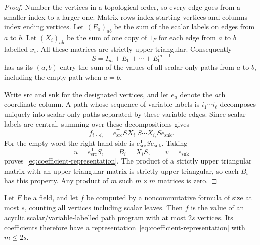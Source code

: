 \begin{proof}
Number the vertices in a topological order, so every edge goes from a smaller
index to a larger one.  Matrix rows index starting vertices and columns index
ending vertices.  Let $(E_0)_{ab}$ be the sum of the scalar labels on edges
from $a$ to $b$.  Let $(X_i)_{ab}$ be the sum of one copy of $1_F$ for each
edge from $a$ to $b$ labelled $x_i$.  All these matrices are strictly upper
triangular.  Consequently
\[
 S=I_m+E_0+\cdots+E_0^{m-1}
\]
has as its $(a,b)$ entry the sum of the values of all scalar-only paths from
$a$ to $b$, including the empty path when $a=b$.

Write $\mathrm{src}$ and $\mathrm{snk}$ for the designated vertices, and let
$e_a$ denote the $a$th coordinate column.  A path whose sequence of variable
labels is $i_1\cdots i_\ell$ decomposes uniquely into scalar-only paths
separated by these variable edges.  Since scalar labels are central, summing
over these decompositions gives
\begin{equation}
\label{eq:scalar-path-elimination}
 f_{i_1\cdots i_\ell}
 =e_{\mathrm{src}}^{\mathsf T}
   S X_{i_1}S\cdots X_{i_\ell}S e_{\mathrm{snk}}.
\end{equation}
For the empty word the right-hand side is
$e_{\mathrm{src}}^{\mathsf T}S e_{\mathrm{snk}}$.
Taking
\[
 u=e_{\mathrm{src}}^{\mathsf T}S,
 \qquad B_i=X_iS,
 \qquad v=e_{\mathrm{snk}}
\]
proves~\eqref{eq:coefficient-representation}.  The product of a strictly
upper triangular matrix with an upper triangular matrix is strictly upper
triangular, so each $B_i$ has this property.  Any product of $m$ such
$m\times m$ matrices is zero.
\end{proof}

\begin{lemma}
\label{lem:formula-representation}
Let $F$ be a field, and let $f$ be computed by a noncommutative formula of
size at most $s$, counting all vertices including scalar leaves.  Then $f$
is the value of an acyclic scalar/variable-labelled path program with at
most $2s$ vertices.  Its coefficients therefore have a
representation~\eqref{eq:coefficient-representation} with $m\leq 2s$.
\end{lemma}

